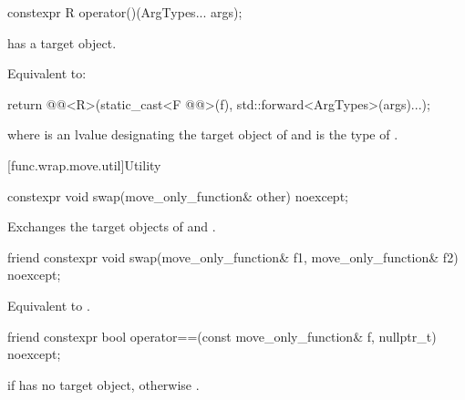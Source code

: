 %
\begin{itemdecl}
constexpr R operator()(ArgTypes... args);
\end{itemdecl}

\begin{itemdescr}
\pnum
\expects
{} has a target object.

\pnum
\effects
Equivalent to:
\begin{codeblock}
return @@<R>(static_cast<F @@>(f), std::forward<ArgTypes>(args)...);
\end{codeblock}
where  is an lvalue designating the target object of  and
 is the type of .
\end{itemdescr}

[func.wrap.move.util]{Utility}

%
\begin{itemdecl}
constexpr void swap(move_only_function& other) noexcept;
\end{itemdecl}

\begin{itemdescr}
\pnum
\effects
Exchanges the target objects of  and .
\end{itemdescr}

%
\begin{itemdecl}
friend constexpr void swap(move_only_function& f1, move_only_function& f2) noexcept;
\end{itemdecl}

\begin{itemdescr}
\pnum
\effects
Equivalent to .
\end{itemdescr}

%
\begin{itemdecl}
friend constexpr bool operator==(const move_only_function& f, nullptr_t) noexcept;
\end{itemdecl}

\begin{itemdescr}
\pnum
\returns
{} if  has no target object, otherwise .
\end{itemdescr}
